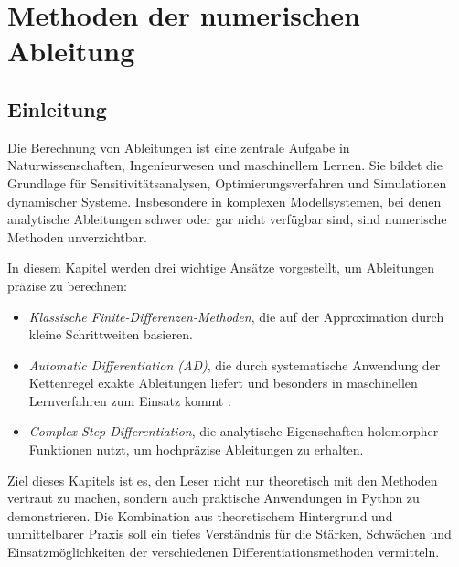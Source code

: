 %
%
%
%
\chapter{Methoden der numerischen Ableitung\label{chapter:step}}
\begin{refsection}
%
%

\section*{Einleitung}

Die Berechnung von Ableitungen ist eine zentrale Aufgabe in Naturwissenschaften, Ingenieurwesen und maschinellem Lernen.
%
%
%
Sie bildet die Grundlage für Sensitivitätsanalysen, Optimierungsverfahren und Simulationen dynamischer Systeme.
%
%
%
Insbesondere in komplexen Modellsystemen, bei denen analytische Ableitungen schwer oder gar nicht verfügbar sind, sind numerische Methoden unverzichtbar.

In diesem Kapitel werden drei wichtige Ansätze vorgestellt, um Ableitungen präzise zu berechnen:

\begin{itemize}
	\item \emph{Klassische Finite-Differenzen-Methoden}, die auf der Approximation durch kleine Schrittweiten basieren.
%
	\item \emph{Automatic Differentiation (AD)}, die durch systematische Anwendung der Kettenregel exakte Ableitungen liefert und besonders in maschinellen Lernverfahren zum Einsatz kommt \cite{step:baydin2018}.
%
	\item \emph{Complex-Step-Differentiation}, die analytische Eigenschaften holomorpher Funktionen nutzt, um hochpräzise Ableitungen zu erhalten.
%
\end{itemize}
Ziel dieses Kapitels ist es, den Leser nicht nur theoretisch mit den Methoden vertraut zu machen, sondern auch praktische Anwendungen in Python zu demonstrieren.
Die Kombination aus theoretischem Hintergrund und unmittelbarer Praxis soll ein tiefes Verständnis für die Stärken, Schwächen und Einsatzmöglichkeiten der verschiedenen Differentiationsmethoden vermitteln.
%






\printbibliography[heading=subbibliography]
\end{refsection}

